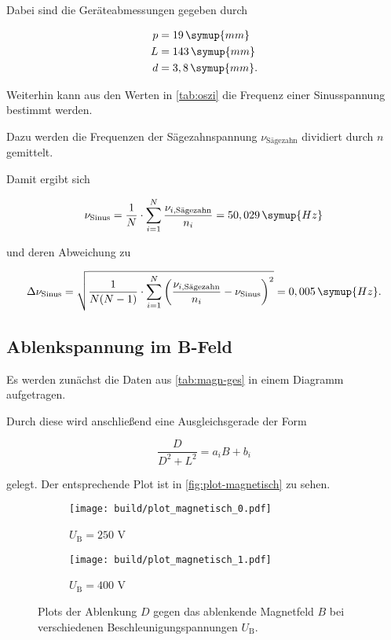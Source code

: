 Dabei sind die Geräteabmessungen gegeben durch

\begin{align*}
  p &= 19  \, \symup{mm} \\
  L &= 143 \, \symup{mm} \\
  d &= 3,8 \, \symup{mm}.
\end{align*}

Weiterhin kann aus den Werten in \autoref{tab:oszi} die Frequenz einer Sinusspannung bestimmt werden.



Dazu werden die Frequenzen der Sägezahnspannung $\nu_\text{Sägezahn}$ dividiert durch $n$ gemittelt.

Damit ergibt sich 

\begin{equation}
  \nu_\text{Sinus} = \frac{1}{N} \cdot \sum_{i=1}^{N} \frac{\nu_{i, \text{Sägezahn}} }{n_i} = 50,029 \, \symup{Hz}
\end{equation}

und deren Abweichung zu 

\begin{equation}
  \Delta \nu_\text{Sinus} = \sqrt{ \frac{1}{N(N-1)} \cdot \sum_{i=1}^{N} \bigg( \frac{\nu_{i, \text{Sägezahn}}}{n_i} - \nu_\text{Sinus} \bigg)^2 } = 0,005 \, \symup{Hz}.
\end{equation}


\subsection{Ablenkspannung im B-Feld}

Es werden zunächst die Daten aus \autoref{tab:magn-ges} in einem Diagramm aufgetragen.



Durch diese wird anschließend eine Ausgleichsgerade der Form

\begin{equation}
  \frac{D}{D^2 + L^2} = a_i B + b_i
\end{equation}

gelegt. Der entsprechende Plot ist in \autoref{fig:plot-magnetisch} zu sehen.

\begin{figure}
  \centering
  \begin{subfigure}{0.49\textwidth}
    \centering
    \texttt{[image: build/plot\_magnetisch\_0.pdf]}
    \caption{$U_\text{B} = 250$ V}
  \end{subfigure}
  \begin{subfigure}{0.49\textwidth}
    \centering
    \texttt{[image: build/plot\_magnetisch\_1.pdf]}
    \caption{$U_\text{B} = 400$ V}
  \end{subfigure}
  \caption{Plots der Ablenkung $D$ gegen das ablenkende Magnetfeld $B$ bei verschiedenen Beschleunigungspannungen $U_\text{B}$.}
  \label{fig:plot-magnetisch}
\end{figure}

